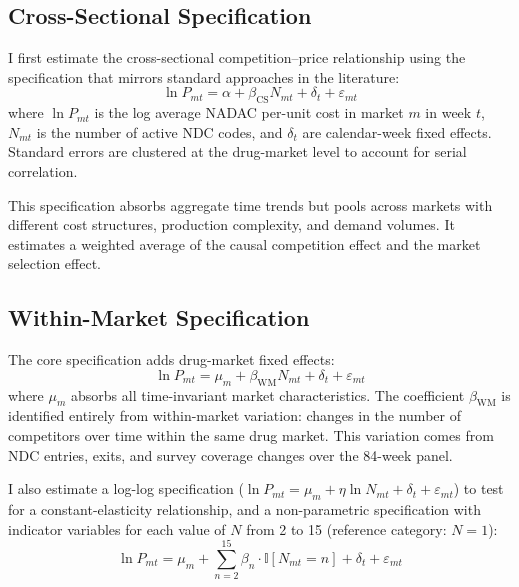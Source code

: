 \documentclass[12pt]{article}
\newcommand{\ind}{\mathbb{I}}
\begin{document}
\subsection{Cross-Sectional Specification}

I first estimate the cross-sectional competition--price relationship using the specification that mirrors standard approaches in the literature:
\begin{equation}\label{eq:cross_spec}
\ln P_{mt} = \alpha + \beta_{\text{CS}} N_{mt} + \delta_t + \varepsilon_{mt}
\end{equation}
where $\ln P_{mt}$ is the log average NADAC per-unit cost in market $m$ in week $t$, $N_{mt}$ is the number of active NDC codes, and $\delta_t$ are calendar-week fixed effects. Standard errors are clustered at the drug-market level to account for serial correlation.

This specification absorbs aggregate time trends but pools across markets with different cost structures, production complexity, and demand volumes. It estimates a weighted average of the causal competition effect and the market selection effect.

\subsection{Within-Market Specification}

The core specification adds drug-market fixed effects:
\begin{equation}\label{eq:within_spec}
\ln P_{mt} = \mu_m + \beta_{\text{WM}} N_{mt} + \delta_t + \varepsilon_{mt}
\end{equation}
where $\mu_m$ absorbs all time-invariant market characteristics. The coefficient $\beta_{\text{WM}}$ is identified entirely from within-market variation: changes in the number of competitors over time within the same drug market. This variation comes from NDC entries, exits, and survey coverage changes over the 84-week panel.

I also estimate a log-log specification ($\ln P_{mt} = \mu_m + \eta \ln N_{mt} + \delta_t + \varepsilon_{mt}$) to test for a constant-elasticity relationship, and a non-parametric specification with indicator variables for each value of $N$ from 2 to 15 (reference category: $N = 1$):
\begin{equation}\label{eq:nonparam}
\ln P_{mt} = \mu_m + \sum_{n=2}^{15} \beta_n \cdot \ind[N_{mt} = n] + \delta_t + \varepsilon_{mt}
\end{equation}
\end{document}
